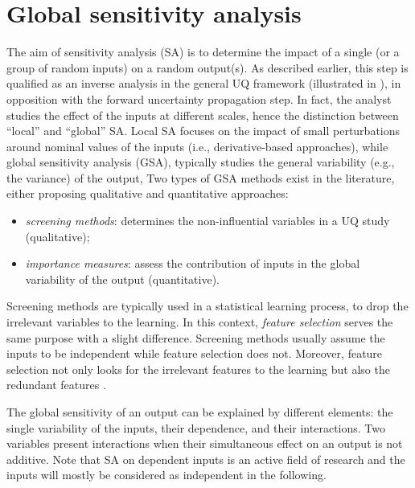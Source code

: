\section{Global sensitivity analysis} \label{sec:gsa}

The aim of sensitivity analysis (SA) is to determine the impact of a single (or a group of random inputs) on a random output(s). 
As described earlier, this step is qualified as an inverse analysis in the general UQ framework (illustrated in ), in opposition with the forward uncertainty propagation step. 
In fact, the analyst studies the effect of the inputs at different scales, hence the distinction between ``local'' and ``global'' SA. 
Local SA focuses on the impact of small perturbations around nominal values of the inputs (i.e., derivative-based approaches), while
global sensitivity analysis (GSA), typically studies the general variability (e.g., the variance) of the output, 
Two types of GSA methods exist in the literature, either proposing qualitative and quantitative approaches:  
\begin{itemize}
    \item \textit{screening methods}: determines the non-influential variables in a UQ study (qualitative);
    \item \textit{importance measures}: assess the contribution of inputs in the global variability of the output (quantitative).
\end{itemize}

Screening methods are typically used in a statistical learning process, to drop the irrelevant variables to the learning. 
In this context, \textit{feature selection} serves the same purpose with a slight difference. 
Screening methods usually assume the inputs to be independent while feature selection does not. 
Moreover, feature selection not only looks for the irrelevant features to the learning but also the redundant features \citep{fan_2010_feature_selection}.     

The global sensitivity of an output can be explained by different elements: the single variability of the inputs, their dependence, and their interactions. 
Two variables present interactions when their simultaneous effect on an output is not additive. 
Note that SA on dependent inputs is an active field of research and the inputs will mostly be considered as independent in the following.



